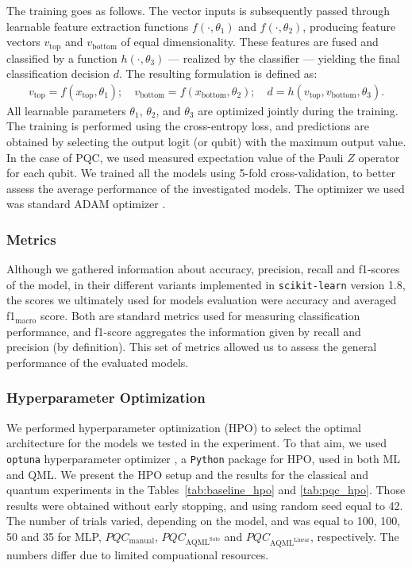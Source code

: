 \documentclass[runningheads]{llncs}
\begin{document}
The training goes as follows. The vector inputs is subsequently passed through learnable feature extraction
functions $f(\cdot,\theta_1)$ and $f(\cdot,\theta_2)$, producing feature vectors $v_{\mathrm{top}}$ and
$v_{\mathrm{bottom}}$ of equal dimensionality. These features are fused and classified by a function
$h(\cdot,\theta_3)$ --- realized by the classifier --- yielding the final classification decision $d$. The
resulting formulation is defined as:
\begin{align*}
	v_{\mathrm{top}}    = f(x_{\mathrm{top}}, \theta_1); \quad 
	v_{\mathrm{bottom}}  = f(x_{\mathrm{bottom}}, \theta_2); \quad
	d                    = h(v_{\mathrm{top}}, v_{\mathrm{bottom}}, \theta_3).
\end{align*}
All learnable parameters $\theta_1$, $\theta_2$, and $\theta_3$ are optimized jointly during the training. The
training is performed using the cross-entropy loss, and predictions are obtained by selecting the output
logit (or qubit) with the maximum output value. In the case of PQC, we used measured expectation value of the
Pauli $Z$ operator for each qubit. We trained all the models using 5-fold cross-validation, to better assess the
average performance of the investigated models. The optimizer we used was standard ADAM optimizer \cite{ADAM}.


\subsubsection{Metrics}
Although we gathered information about accuracy, precision, recall and f1-scores of the model, in their different
variants implemented in \texttt{scikit-learn} version 1.8, the scores we ultimately used for models evaluation were
accuracy and averaged f1$_{\mathrm{macro}}$ score. Both are standard metrics used for measuring classification
performance, and f1-score aggregates the information given by recall and precision (by definition). This set of
metrics allowed us to assess the general performance of the evaluated models.


\subsubsection{Hyperparameter Optimization}
\label{ssec:hpo}

We performed hyperparameter optimization (HPO) to select the optimal architecture for the models we tested in the
experiment. To that aim, we used \texttt{optuna} hyperparameter optimizer \cite{optuna}, a \texttt{Python} package
for HPO, used in both ML and QML. We present the HPO setup and the results for the classical and quantum experiments in
the Tables~\ref{tab:baseline_hpo} and \ref{tab:pqc_hpo}. Those results were obtained without early stopping, and
using random seed equal to 42. The number of trials varied, depending on the model, and was equal to 100, 100, 50
and 35 for MLP, $PQC_{\mathrm{manual}}$, $PQC_{\mathrm{AQML}^{\mathrm{Solo}}}$ and
$PQC_{\mathrm{AQML}^{\mathrm{Linear}}}$, respectively. The numbers differ due to limited compuational
resources.
\end{document}
